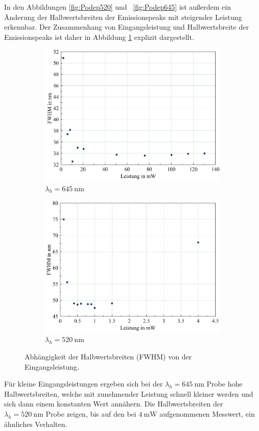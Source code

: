 In den Abbildungen \ref{fig:Podep520} und ~\ref{fig:Podep645} ist außerdem ein
Änderung der Halbwertsbreiten der Emissionspeaks mit steigender Leistung
erkennbar. Der Zusammenhang von Eingangsleistung und Halbwertsbreite der Emissionspeaks
ist daher in Abbildung \ref{fig:FWHM} explizit dargestellt.

\begin{figure}[H]
  \centering
    \begin{subfigure}{0.49\textwidth}
      \includegraphics[width=\textwidth]{plots/FWHMplot_645.png}
      \caption{$\lambda_h = \SI{645}{\nano\meter}$}
    \end{subfigure}
    \begin{subfigure}{0.49\textwidth}
      \includegraphics[width=\textwidth]{plots/FWHMplot_520.png}
      \caption{$\lambda_h = \SI{520}{\nano\meter}$}
    \end{subfigure}
  \caption{Abhängigkeit der Halbwertsbreiten (FWHM) von der Eingangsleistung.}
  \label{fig:FWHM}
\end{figure}
Für kleine Eingangsleistungen ergeben sich bei
der $\lambda_h=\SI{645}{\nano\meter}$ Probe
hohe Halbwertsbreiten, welche mit zunehmender Leistung
schnell kleiner werden und sich dann einem konstanten Wert annähern.
Die Halbwertsbreiten der $\lambda_h=\SI{520}{\nano\meter}$ Probe
zeigen, bis auf den bei $\SI{4}{\milli\watt}$ aufgenommenen Messwert, ein ähnliches Verhalten.


